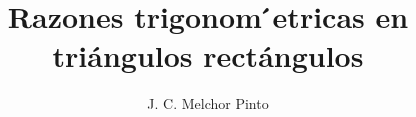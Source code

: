 \documentclass[12pt]{guia}
\title{Razones trigonom ́etricas en triángulos rectángulos}
\author{J. C. Melchor Pinto}
\begin{document}
\pagestyle{headandfoot}
\addpoints
\INFO
\printanswers

\newpage
\begin{questions}
    
    \newpage
    
    
    \newpage
    
    
    \newpage
    
    
    
    \newpage
    
    
    
    \newpage
    
    
    
    \newpage
    
    
    
    \newpage
    
\end{questions}
\end{document}
